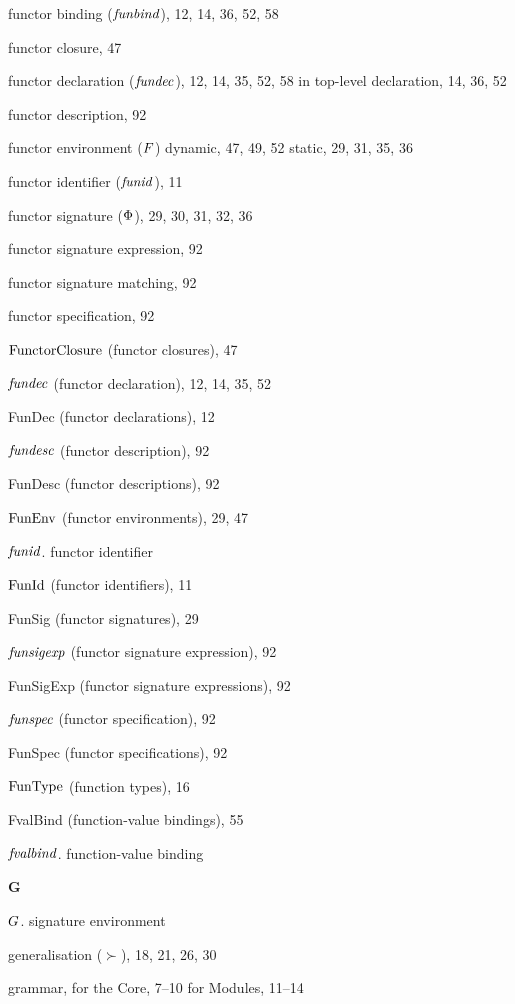 \begin{theindex}
\item functor binding (${\it funbind}$), 12, 14, 36, 52, 58
\item functor closure, 47
\item functor declaration (${\it fundec}$), 12, 14, 35, 52, 58
\subitem in top-level declaration, 14, 36, 52
\item functor description, 92
\item functor environment ($F$)
\subitem dynamic, 47, 49, 52
\subitem static, 29, 31, 35, 36
\item functor identifier (${\it funid}$), 11
\item functor signature ($\Phi$), 29, 30, 31, 32, 36
\item functor signature expression, 92
\item functor signature matching, 92
\item functor specification, 92
\item ${\rm FunctorClosure}$ (functor closures), 47
\item ${\it fundec}$ (functor declaration), 12, 14, 35, 52
\item FunDec (functor declarations), 12
\item ${\it fundesc}$ (functor description), 92
\item FunDesc (functor descriptions), 92
\item ${\rm FunEnv}$ (functor environments), 29, 47
\item ${\it funid}$. \see functor identifier
\item ${\rm FunId}$ (functor identifiers), 11
\item FunSig (functor signatures), 29
\item ${\it funsigexp}$ (functor signature expression), 92
\item FunSigExp (functor signature expressions), 92
\item ${\it funspec}$ (functor specification), 92
\item FunSpec (functor specifications), 92
\item ${\rm FunType}$ (function types), 16
\item FvalBind (function-value bindings), 55
\item ${\it fvalbind}$. \see function-value binding
\indexspace
\parbox{65mm}{\hfil{\large\bf G}\hfil}
\indexspace
\item $G$. \see signature environment
\item generalisation ($\succ$), 18, 21, 26, 30
\item grammar,
\subitem for the Core, 7--10
\subitem for Modules, 11--14

\end{theindex}
